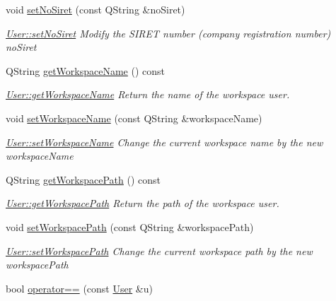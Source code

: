 \begin{DoxyCompactItemize}
void \hyperlink{classModels_1_1User_ae751ee06859dffce0cad08005c42c933}{set\-No\-Siret} (const Q\-String \&no\-Siret)
\begin{DoxyCompactList}\small\item\em \hyperlink{classModels_1_1User_ae751ee06859dffce0cad08005c42c933}{User\-::set\-No\-Siret} Modify the S\-I\-R\-E\-T number (company registration number) {\itshape no\-Siret} \end{DoxyCompactList}\item 
Q\-String \hyperlink{classModels_1_1User_adf4c52429656a4f44c15d879caee5b10}{get\-Workspace\-Name} () const 
\begin{DoxyCompactList}\small\item\em \hyperlink{classModels_1_1User_adf4c52429656a4f44c15d879caee5b10}{User\-::get\-Workspace\-Name} Return the name of the workspace user. \end{DoxyCompactList}\item 
void \hyperlink{classModels_1_1User_ae51aa34e41159fe7e4541a8cfddc50a3}{set\-Workspace\-Name} (const Q\-String \&workspace\-Name)
\begin{DoxyCompactList}\small\item\em \hyperlink{classModels_1_1User_ae51aa34e41159fe7e4541a8cfddc50a3}{User\-::set\-Workspace\-Name} Change the current workspace name by the new {\itshape workspace\-Name} \end{DoxyCompactList}\item 
Q\-String \hyperlink{classModels_1_1User_aa9421bda240316f9eebd0145f6dc3eda}{get\-Workspace\-Path} () const 
\begin{DoxyCompactList}\small\item\em \hyperlink{classModels_1_1User_aa9421bda240316f9eebd0145f6dc3eda}{User\-::get\-Workspace\-Path} Return the path of the workspace user. \end{DoxyCompactList}\item 
void \hyperlink{classModels_1_1User_ae62b6cc7c6c5f5ab80b9f066b67afc95}{set\-Workspace\-Path} (const Q\-String \&workspace\-Path)
\begin{DoxyCompactList}\small\item\em \hyperlink{classModels_1_1User_ae62b6cc7c6c5f5ab80b9f066b67afc95}{User\-::set\-Workspace\-Path} Change the current workspace path by the new {\itshape workspace\-Path} \end{DoxyCompactList}\item 
bool \hyperlink{classModels_1_1User_a60d18c2d1df053f1abf1215414f0b4b6}{operator==} (const \hyperlink{classModels_1_1User}{User} \&u)

\end{DoxyCompactItemize}
